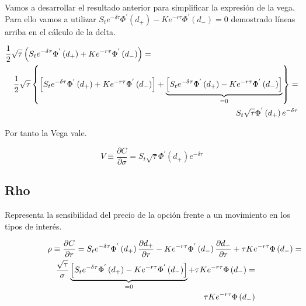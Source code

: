 \documentclass[12pt]{article}
\begin{document}
Vamos a desarrollar el resultado anterior para simplificar la expresi\'{o}n de la vega. Para ello vamos a utilizar
$S_{t}e^{-\delta\tau}\Phi^{'}\left(d_{+}\right)-Ke^{-r\tau}\Phi^{'}\left(d_{-}\right) = 0$ demostrado l\'{i}neas arriba en el c\'{a}lculo
de la delta.
\newline

\begin{eqnarray}
	\lefteqn{\frac{1}{2}\sqrt{\tau}\left(S_{t}e^{-\delta\tau}\Phi^{'}\left(d_{+}\right) + 
	Ke^{-r\tau}\Phi^{'}\left(d_{-}\right)\right) = } \nonumber \\
	 & & \frac{1}{2}\sqrt{\tau}\left\{\left[S_{t} e^{-\delta\tau}\Phi^{'}\left(d_{+}\right) + 
	Ke^{-r\tau}\Phi^{'}\left(d_{-}\right)\right] + \underbrace{\left[S_{t} e^{-\delta\tau}\Phi^{'}\left(d_{+}\right) -
	Ke^{-r\tau}\Phi^{'}\left(d_{-}\right)\right]}_{=0}\right\} = \nonumber \\
	 & & S_{t}\sqrt{\tau}\Phi^{'}\left(d_{+}\right)e^{-\delta\tau} \nonumber
\end{eqnarray}
\newline

Por tanto la Vega vale.
\newline

\begin{equation}
	V \equiv \frac{\partial C}{\partial\sigma} = S_{t}\sqrt{\tau}\Phi^{'}\left(d_{+}\right)e^{-\delta\tau}
\end{equation}
\newline

\subsection{Rho}
Representa la sensibilidad del precio de la opci\'{o}n frente a un movimiento en los tipos de inter\'{e}s.
\newline

\begin{eqnarray*}
	\lefteqn{\rho \equiv \frac{\partial C}{\partial r} = S_{t}e^{-\delta\tau}\Phi^{'}\left(d_{+}\right)\frac{\partial d_{+}}
		{\partial r} - Ke^{-r\tau}\Phi^{'}\left(d_{-}\right)\frac{\partial d_{-}}{\partial r} + \tau K e^{-r\tau}\Phi\left(
		d_{-}\right) = } \\
	 & & \frac{\sqrt{\tau}}{\sigma}\underbrace{\left[S_{t}e^{-\delta\tau}\Phi^{'}\left(d_{+}\right)-Ke^{-r\tau}\Phi^{'}\left(
		d_{-}\right)\right]}_{=0} + \tau K e^{-r\tau}\Phi\left(d_{-}\right) = \\
	 & & \tau K e^{-r\tau}\Phi\left(d_{-}\right) 
\end{eqnarray*}
\newline
\end{document}
